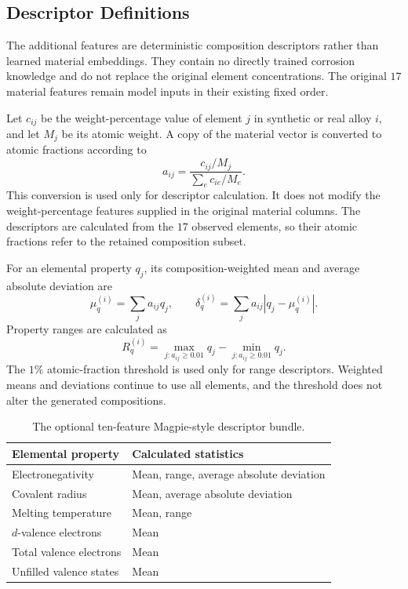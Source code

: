 \documentclass{article}
\begin{document}
\subsection{Descriptor Definitions}

The additional features are deterministic composition descriptors rather than
learned material embeddings. They contain no directly trained corrosion
knowledge and do not replace the original element concentrations. The original
\(17\) material features remain model inputs in their existing fixed order.

Let \(c_{ij}\) be the weight-percentage value of element \(j\) in synthetic
or real alloy \(i\), and let \(M_j\) be its atomic weight. A copy of the
material vector is converted to atomic fractions according to
\begin{equation}
a_{ij}=\frac{c_{ij}/M_j}{\sum_e c_{ie}/M_e}.
\label{eq:magpie-atomic-fractions}
\end{equation}
This conversion is used only for descriptor calculation. It does not modify
the weight-percentage features supplied in the original material columns.
The descriptors are calculated from the \(17\) observed elements, so their
atomic fractions refer to the retained composition subset.

For an elemental property \(q_j\), its composition-weighted mean and average
absolute deviation are
\begin{equation}
\mu_q^{(i)}=\sum_j a_{ij}q_j,
\qquad
\delta_q^{(i)}=\sum_j a_{ij}|q_j-\mu_q^{(i)}|.
\label{eq:magpie-mean-deviation}
\end{equation}
Property ranges are calculated as
\begin{equation}
R_q^{(i)}=\max_{j:a_{ij}\geq0.01}q_j
         -\min_{j:a_{ij}\geq0.01}q_j.
\label{eq:magpie-range}
\end{equation}
The \(1\%\) atomic-fraction threshold is used only for range descriptors.
Weighted means and deviations continue to use all elements, and the threshold
does not alter the generated compositions.

\begin{table}[htbp]
\centering
\caption{The optional ten-feature Magpie-style descriptor bundle.}
\label{tab:magpie-descriptors}
\begin{tabularx}{\linewidth}{lL}
\toprule
Elemental property & Calculated statistics \\
\midrule
Electronegativity & Mean, range, average absolute deviation \\
Covalent radius & Mean, average absolute deviation \\
Melting temperature & Mean, range \\
\(d\)-valence electrons & Mean \\
Total valence electrons & Mean \\
Unfilled valence states & Mean \\
\bottomrule
\end{tabularx}
\end{table}
\end{document}
